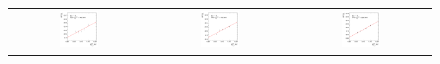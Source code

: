 \begin{figure}[ht]
  \centering
  \begin{tabular}{ccc}
    \includegraphics[width=0.3\textwidth]{figures/ResFit_Spring10QCDFlat_CB_Eta0_ExtrapolatedPar0_PtBin0} &
    \includegraphics[width=0.3\textwidth]{figures/ResFit_Spring10QCDFlat_CB_Eta0_ExtrapolatedPar0_PtBin1} &
    \includegraphics[width=0.3\textwidth]{figures/ResFit_Spring10QCDFlat_CB_Eta0_ExtrapolatedPar0_PtBin2} \\


\end{tabular}
\end{figure}
